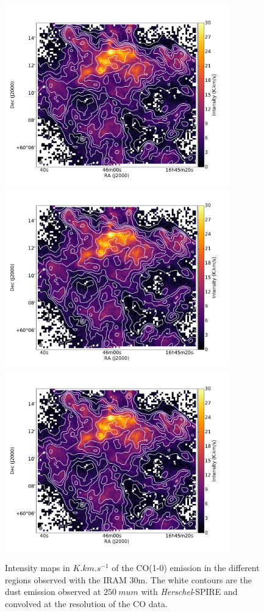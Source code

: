 \documentclass[traditabstract]{aa}
\begin{document}
\begin{figure}[h!]
  \hspace{3mm}
  \includegraphics[page=5,height=7.8cm,trim=165 30 230 75,clip=true]{Figures/CO10_intensity.pdf} \\
  \includegraphics[page=3,height=7.8cm,trim=55 30 120 75,clip=true]{Figures/CO10_intensity.pdf}
  \hspace{3mm}
  \includegraphics[page=6,height=7.8cm,trim=215 30 280 75,clip=true]{Figures/CO10_intensity.pdf}
  \caption{\label{Draco_CO10} Intensity maps in $K.km.s^{-1}$ of the CO(1-0) emission in the different regions observed with the IRAM 30m. The white contours are the dust emission observed at $250\: mu m$ with \emph{Herschel}-SPIRE and convolved at the resolution of the CO data.}
\end{figure}
\end{document}
